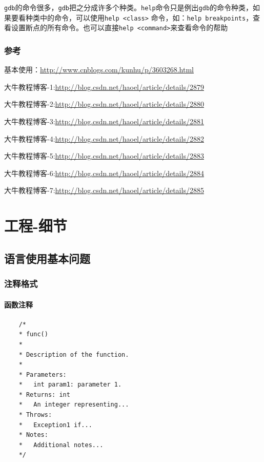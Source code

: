 \documentclass[UTF8,a4paper,12pt]{ctexbook} %
\begin{document}
			 \verb|gdb|的命令很多，\verb|gdb|把之分成许多个种类。\verb|help|命令只是例出\verb|gdb|的命令种类，如果要看种类中的命令，可以使用\verb|help <class>| 命令，如：\verb|help breakpoints|，查看设置断点的所有命令。也可以直接\verb|help <command>|来查看命令的帮助
		\subsection{参考}
			基本使用：\url{http://www.cnblogs.com/kunhu/p/3603268.html}
			
			大牛教程博客-1:\url{http://blog.csdn.net/haoel/article/details/2879}
			
			大牛教程博客-2:\url{http://blog.csdn.net/haoel/article/details/2880}
			
			大牛教程博客-3:\url{http://blog.csdn.net/haoel/article/details/2881}
			
			大牛教程博客-4:\url{http://blog.csdn.net/haoel/article/details/2882}
			
			大牛教程博客-5:\url{http://blog.csdn.net/haoel/article/details/2883}
			
			大牛教程博客-6:\url{http://blog.csdn.net/haoel/article/details/2884}
			
			大牛教程博客-7:\url{http://blog.csdn.net/haoel/article/details/2885}
\chapter{工程-细节}
\section{语言使用基本问题}
		\subsection{注释格式}
			\subsubsection{函数注释}
			\begin{lstlisting}
	/*
	* func()
	*
	* Description of the function.
	*
	* Parameters:
	* 	int param1: parameter 1.
	* Returns: int
	* 	An integer representing...
	* Throws:
	* 	Exception1 if...
	* Notes:
	* 	Additional notes...
	*/
			\end{lstlisting}
\end{document}
